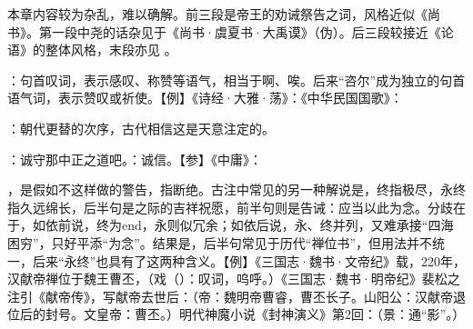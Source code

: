 {
本章内容较为杂乱，难以确解。前三段是帝王的劝诫祭告之词，风格近似《尚书》。第一段中尧的话杂见于《尚书·虞夏书·大禹谟》（伪）。后三段较接近《论语》的整体风格，末段亦见 。 %
\begin{lyitemize}
\item {}：句首叹词，表示感叹、称赞等语气，相当于啊、唉。后来“咨尔”成为独立的句首语气词，表示赞叹或祈使。【例】《诗经·大雅·荡》：《中华民国国歌》：
\item {}：朝代更替的次序，古代相信这是天意注定的。%
\item {}：诚守那中正之道吧。：诚信。【参】《中庸》：

，是假如不这样做的警告，指断绝。古注中常见的另一种解说是，终指极尽，永终指久远绵长，后半句是之际的吉祥祝愿，前半句则是告诫：应当以此为念。分歧在于，如依前说，终为end，永则似冗余；如依后说，永、终并列，又难承接“四海困穷”，只好平添“为念”。结果是，后半句常见于历代“禅位书”，但用法并不统一，后来“永终”也具有了这两种含义。【例】《三国志·魏书·文帝纪》载，220年，汉献帝禅位于魏王曹丕，（戏（）：叹词，呜呼。）《三国志·魏书·明帝纪》裴松之注引《献帝传》，写献帝去世后：（帝：魏明帝曹睿，曹丕长子。山阳公：汉献帝退位后的封号。文皇帝：曹丕。）明代神魔小说《封神演义》第2回：（景：通“影”。）


\end{lyitemize}}
